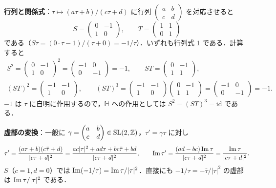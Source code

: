 \textbf{行列と関係式}：$\tau\mapsto(a\tau+b)/(c\tau+d)$ に行列 $\begin{pmatrix}a&b\\c&d\end{pmatrix}$ を対応させると
\begin{equation*}
  S=\begin{pmatrix}0&-1\\1&0\end{pmatrix},\qquad T=\begin{pmatrix}1&1\\0&1\end{pmatrix}
\end{equation*}
である（$S\tau=(0\cdot\tau-1)/(\tau+0)=-1/\tau$）．いずれも行列式 $1$ である．計算すると
\begin{gather*}
  S^2=\begin{pmatrix}0&-1\\1&0\end{pmatrix}^2=\begin{pmatrix}-1&0\\0&-1\end{pmatrix}=-1,\qquad
  ST=\begin{pmatrix}0&-1\\1&1\end{pmatrix},\\
  (ST)^2=\begin{pmatrix}-1&-1\\1&0\end{pmatrix},\qquad
  (ST)^3=\begin{pmatrix}-1&-1\\1&0\end{pmatrix}\begin{pmatrix}0&-1\\1&1\end{pmatrix}=\begin{pmatrix}-1&0\\0&-1\end{pmatrix}=-1 .
\end{gather*}
$-1$ は $\tau$ に自明に作用するので，$\mathbb{H}$ への作用としては $S^2=(ST)^3=\mathrm{id}$ である．

\textbf{虚部の変換}：一般に $\gamma=\begin{pmatrix}a&b\\c&d\end{pmatrix}\in\operatorname{SL}(2,\mathbb{Z})$，$\tau'=\gamma\tau$ に対し
\begin{equation*}
  \tau' = \frac{(a\tau+b)(c\bar\tau+d)}{|c\tau+d|^2} = \frac{ac|\tau|^2+ad\tau+bc\bar\tau+bd}{|c\tau+d|^2},\qquad
  \operatorname{Im}\tau' = \frac{(ad-bc)\operatorname{Im}\tau}{|c\tau+d|^2} = \frac{\operatorname{Im}\tau}{|c\tau+d|^2}.
\end{equation*}
$S$（$c=1,d=0$）では $\operatorname{Im}(-1/\tau)=\operatorname{Im}\tau/|\tau|^2$．直接にも $-1/\tau=-\bar\tau/|\tau|^2$ の虚部は $\operatorname{Im}\tau/|\tau|^2$ である．

